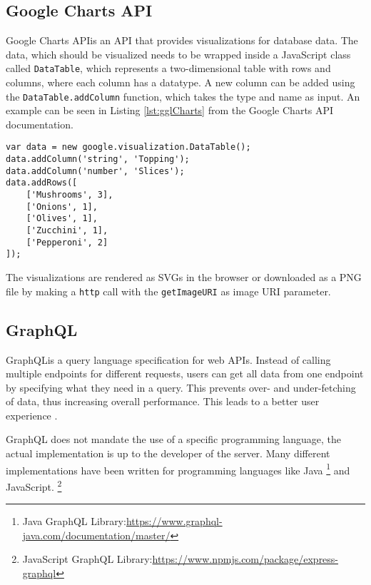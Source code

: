 \subsection{Google Charts API}
Google Charts API\footnotemark is an API that provides visualizations for database data. The data, which should be visualized needs to be wrapped inside a JavaScript class called \texttt{DataTable}, which represents a two-dimensional table with rows and columns, where each column has a datatype.
A new column can be added using the \texttt{DataTable.addColumn} function, which takes the type and name as input. An example can be seen in Listing \ref{lst:gglCharts} from the Google Charts API documentation\footnotemark[\value{footnote}].

\begin{lstlisting}[caption=Example use of the DataTable class,captionpos=b,label={lst:gglCharts}]
var data = new google.visualization.DataTable();
data.addColumn('string', 'Topping');
data.addColumn('number', 'Slices');
data.addRows([
	['Mushrooms', 3],
	['Onions', 1],
	['Olives', 1], 
	['Zucchini', 1],
	['Pepperoni', 2]
]);
\end{lstlisting}

The visualizations are rendered as SVGs in the browser or downloaded as a PNG file by making a \texttt{http} call with the \texttt{getImageURI} as image URI parameter. 

\subsection{GraphQL}
GraphQL\footnotemark is a query language specification for web APIs.
Instead of calling multiple endpoints for different requests, users can get all data from one endpoint by specifying what they need in a query. This prevents over- and under-fetching of data\footnotemark, thus increasing overall performance. This leads to a better user experience \cite{KKK20}.


GraphQL does not mandate the use of a specific programming language, the actual implementation is up to the developer of the server. \footnotemark
{}
Many different implementations have been written for programming languages like Java \footnote{Java GraphQL Library:\href{https://www.graphql-java.com/documentation/master/}{https://www.graphql-java.com/documentation/master/}} and JavaScript. \footnote{JavaScript GraphQL Library:\href{https://www.npmjs.com/package/express-graphql}{https://www.npmjs.com/package/express-graphql}}

